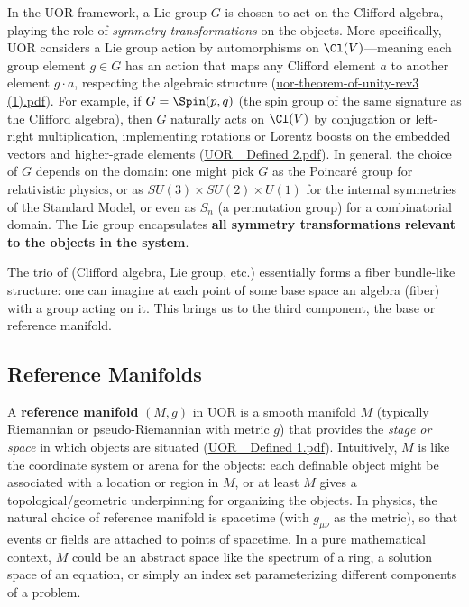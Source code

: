 \documentclass[12pt]{article}
\begin{document}
\medskip

In the UOR framework, a Lie group $G$ is chosen to act on the Clifford algebra, playing the role of \emph{symmetry transformations} on the objects. More specifically, UOR considers a Lie group action by automorphisms on $\Cl(V)$---meaning each group element $g\in G$ has an action that maps any Clifford element $a$ to another element $g\cdot a$, respecting the algebraic structure (\href{file://file-CJBWhjR1XERgfPCpnf5UAs#:~:text=Definition%202,A%20finite%20group%20H}{uor-theorem-of-unity-rev3 (1).pdf}). For example, if $G = \Spin(p,q)$ (the spin group of the same signature as the Clifford algebra), then $G$ naturally acts on $\Cl(V)$ by conjugation or left-right multiplication, implementing rotations or Lorentz boosts on the embedded vectors and higher-grade elements (\href{file://file-TBF3nHDaRR5QeVMmwCFYkp#:~:text=algebra%20contains%20the%20Dirac%20gamma,can%20thus%20embed%20relativistic%20fields}{UOR\_ Defined 2.pdf}). In general, the choice of $G$ depends on the domain: one might pick $G$ as the Poincaré group for relativistic physics, or as $SU(3)\times SU(2)\times U(1)$ for the internal symmetries of the Standard Model, or even as $S_n$ (a permutation group) for a combinatorial domain. The Lie group encapsulates \textbf{all symmetry transformations relevant to the objects in the system}.

\medskip

The trio of (Clifford algebra, Lie group, etc.) essentially forms a fiber bundle-like structure: one can imagine at each point of some base space an algebra (fiber) with a group acting on it. This brings us to the third component, the base or reference manifold.

\subsection{Reference Manifolds}

A \textbf{reference manifold} $(M, g)$ in UOR is a smooth manifold $M$ (typically Riemannian or pseudo-Riemannian with metric $g$) that provides the \emph{stage or space} in which objects are situated (\href{file://file-XiorGa5Wu6KTrCZGytuVSc#:~:text=Reference%20Manifolds%3A%20A%20reference%20manifold,a%20smoothly%20varying}{UOR\_ Defined 1.pdf}). Intuitively, $M$ is like the coordinate system or arena for the objects: each definable object might be associated with a location or region in $M$, or at least $M$ gives a topological/geometric underpinning for organizing the objects. In physics, the natural choice of reference manifold is spacetime (with $g_{\mu\nu}$ as the metric), so that events or fields are attached to points of spacetime. In a pure mathematical context, $M$ could be an abstract space like the spectrum of a ring, a solution space of an equation, or simply an index set parameterizing different components of a problem.
\end{document}
